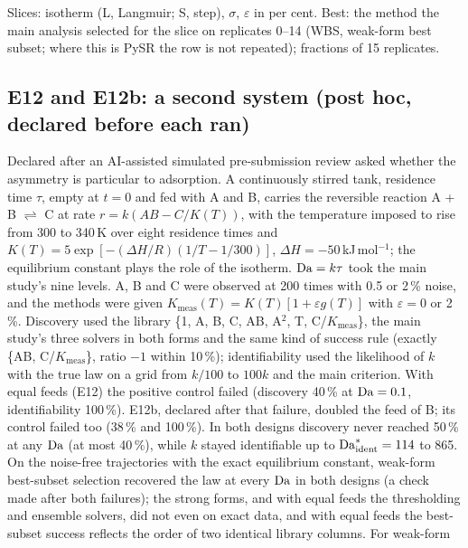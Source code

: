 Slices: isotherm (L, Langmuir; S, step), $\sigma$, $\varepsilon$ in per cent. Best: the method the main analysis
selected for the slice on replicates 0--14 (WBS, weak-form best subset; where this is PySR the row is not
repeated); fractions of 15 replicates.

\subsection*{E12 and E12b: a second system (post hoc, declared before each ran)}
Declared after an AI-assisted simulated pre-submission review asked whether the asymmetry is particular to
adsorption. A continuously stirred tank, residence time $\tau$, empty at $t = 0$ and fed with A and B,
carries the reversible reaction A + B $\rightleftharpoons$ C at rate $r = k(AB - C/K(T))$, with the
temperature imposed to rise from 300 to 340\,K over eight residence times and
$K(T) = 5\exp[-(\Delta H/R)(1/T - 1/300)]$, $\Delta H = -50$\,kJ\,mol$^{-1}$; the equilibrium constant plays the role of the
isotherm. $\mathrm{Da} = k\tau$ took the main study's nine levels. A, B and C were observed at 200 times with
0.5 or 2\,\% noise, and the methods were given $K_{\mathrm{meas}}(T) = K(T)[1 + \varepsilon g(T)]$ with
$\varepsilon = 0$ or 2\,\%. Discovery used the library \{1, A, B, C, AB, A$^2$, T, C/$K_{\mathrm{meas}}$\}, the main
study's three solvers in both forms and the same kind of success rule (exactly \{AB, C/$K_{\mathrm{meas}}$\},
ratio $-1$ within 10\,\%); identifiability used the likelihood of $k$ with the true law on a grid from
$k/100$ to $100k$ and the main criterion. With equal feeds (E12) the positive control failed
(discovery 40\,\% at $\mathrm{Da} = 0.1$, identifiability 100\,\%). E12b, declared after that failure,
doubled the feed of B; its control failed too (38\,\% and 100\,\%). In both designs discovery
never reached 50\,\% at any $\mathrm{Da}$ (at most 40\,\%), while $k$ stayed identifiable up to
$\mathrm{Da}^{*}_{\mathrm{ident}} = 114$ to 865. On the noise-free trajectories with the exact equilibrium constant, weak-form best-subset selection
recovered the law at every $\mathrm{Da}$ in both designs (a check made after both failures); the strong forms,
and with equal feeds the thresholding and ensemble solvers, did not even on exact data, and with equal
feeds the best-subset success reflects the order of two identical library columns. For weak-form
